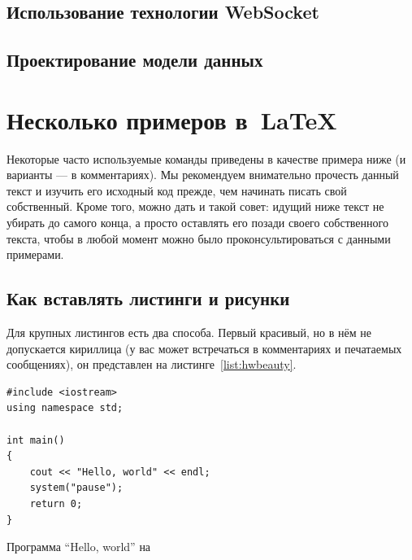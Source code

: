 \subsection{Использование технологии WebSocket} 
\subsection{Проектирование модели данных}

 
 
 
 
 
 
 
   
\section{Несколько примеров в~\LaTeX{}}
\label{sec:examples}

Некоторые часто используемые
команды приведены в качестве примера ниже (и варианты — в
комментариях). Мы рекомендуем внимательно прочесть данный
текст и изучить его исходный код прежде, чем начинать писать
свой собственный. Кроме того, можно дать и такой совет: идущий
ниже текст не убирать до самого конца, а просто оставлять его
позади своего собственного текста, чтобы в любой момент можно
было проконсультироваться с данными примерами.

\subsection{Как вставлять листинги и рисунки}

Для крупных листингов есть два способа. Первый красивый, но в нём не допускается
кириллица (у вас может встречаться в комментариях и
печатаемых сообщениях), он представлен на листинге~\ref{list:hwbeauty}.
\begin{ListingEnv}[H]%
\begin{lstlisting}
#include <iostream>
using namespace std;

int main()
{
    cout << "Hello, world" << endl;
    system("pause");
    return 0;
}
\end{lstlisting}
\caption{Программа “Hello, world” на \protect\cpp}
\label{list:hwbeauty}
\end{ListingEnv}

